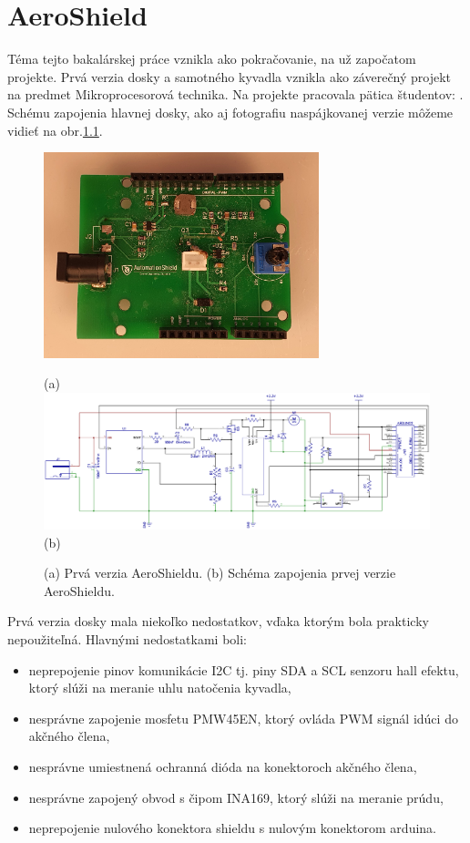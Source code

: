 \chapter{AeroShield}

Téma tejto bakalárskej práce vznikla ako pokračovanie, na už započatom projekte. Prvá verzia dosky a samotného kyvadla vznikla ako záverečný projekt na predmet Mikroprocesorová technika. Na projekte pracovala pätica študentov: . Schému zapojenia hlavnej dosky, ako aj fotografiu naspájkovanej verzie môžeme vidieť na obr.\ref{OBRAZOK 2.1.1}.


\begin{figure}[!tbh]
	\centering
	\includegraphics[width=80mm]{obr/oldshield.jpg}
	
	(a)
	\includegraphics[width=\linewidth]{obr/oldshieldscheme.png}
	(b)
	\caption{(a) Prvá verzia AeroShieldu. (b) Schéma zapojenia prvej verzie AeroShieldu.}
	\label{OBRAZOK 2.1.1}
\end{figure}

\vspace{3cm}

Prvá verzia dosky mala niekoľko nedostatkov, vďaka ktorým bola prakticky nepoužiteľná. Hlavnými nedostatkami boli:

\begin{itemize}
	\item neprepojenie pinov komunikácie I2C tj. piny SDA a SCL senzoru hall efektu, ktorý slúži na meranie uhlu natočenia kyvadla,
	\item nesprávne zapojenie mosfetu PMW45EN, ktorý ovláda PWM signál idúci do akčného člena,
	\item nesprávne umiestnená ochranná dióda na konektoroch akčného člena,
	\item nesprávne zapojený obvod s čipom INA169, ktorý slúži na meranie prúdu,
	\item neprepojenie nulového konektora shieldu s nulovým konektorom arduina.
\end{itemize}

